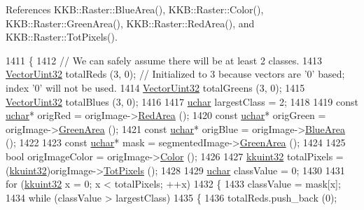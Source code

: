 References K\+K\+B\+::\+Raster\+::\+Blue\+Area(), K\+K\+B\+::\+Raster\+::\+Color(), K\+K\+B\+::\+Raster\+::\+Green\+Area(), K\+K\+B\+::\+Raster\+::\+Red\+Area(), and K\+K\+B\+::\+Raster\+::\+Tot\+Pixels().


\begin{DoxyCode}
1411 \{
1412   \textcolor{comment}{// We can safely assume there will be at least 2 classes.}
1413   \hyperlink{namespace_k_k_b_ab5f0d7bc82b746e1e75e48a6394ccb60}{VectorUint32}  totalReds   (3, 0);  \textcolor{comment}{// Initialized to 3 because vectors are '0' based; index
       '0' will not be used.}
1414   \hyperlink{namespace_k_k_b_ab5f0d7bc82b746e1e75e48a6394ccb60}{VectorUint32}  totalGreens (3, 0);
1415   \hyperlink{namespace_k_k_b_ab5f0d7bc82b746e1e75e48a6394ccb60}{VectorUint32}  totalBlues  (3, 0);
1416 
1417   \hyperlink{namespace_k_k_b_ace9969169bf514f9ee6185186949cdf7}{uchar}  largestClass = 2;
1418 
1419   \textcolor{keyword}{const} \hyperlink{namespace_k_k_b_ace9969169bf514f9ee6185186949cdf7}{uchar}*  origRed   = origImage->\hyperlink{class_k_k_b_1_1_raster_aa3d0f9b4ce0fdd8ac97f996058d09b22}{RedArea}   ();
1420   \textcolor{keyword}{const} \hyperlink{namespace_k_k_b_ace9969169bf514f9ee6185186949cdf7}{uchar}*  origGreen = origImage->\hyperlink{class_k_k_b_1_1_raster_af6ceacfa7835a295d239d141627dbec7}{GreenArea} ();
1421   \textcolor{keyword}{const} \hyperlink{namespace_k_k_b_ace9969169bf514f9ee6185186949cdf7}{uchar}*  origBlue  = origImage->\hyperlink{class_k_k_b_1_1_raster_ade7c77867e6b3833e96f5f86aefcffec}{BlueArea}  ();
1422 
1423   \textcolor{keyword}{const} \hyperlink{namespace_k_k_b_ace9969169bf514f9ee6185186949cdf7}{uchar}*  mask = segmentedImage->\hyperlink{class_k_k_b_1_1_raster_af6ceacfa7835a295d239d141627dbec7}{GreenArea} ();
1424 
1425   \textcolor{keywordtype}{bool}  origImageColor = origImage->\hyperlink{class_k_k_b_1_1_raster_a644248f99009d64ac4b8fef4a22aff25}{Color} ();
1426 
1427   \hyperlink{namespace_k_k_b_af8d832f05c54994a1cce25bd5743e19a}{kkuint32}  totalPixels = (\hyperlink{namespace_k_k_b_af8d832f05c54994a1cce25bd5743e19a}{kkuint32})origImage->\hyperlink{class_k_k_b_1_1_raster_a174a392b71afc2295a0ccbfca3d984e9}{TotPixels} ();
1428 
1429   \hyperlink{namespace_k_k_b_ace9969169bf514f9ee6185186949cdf7}{uchar}  classValue = 0;
1430 
1431   \textcolor{keywordflow}{for}  (\hyperlink{namespace_k_k_b_af8d832f05c54994a1cce25bd5743e19a}{kkuint32} x = 0;  x < totalPixels;  ++x)
1432   \{
1433     classValue = mask[x];
1434     \textcolor{keywordflow}{while} (classValue > largestClass)
1435     \{
1436       totalReds.push\_back   (0);

\end{DoxyCode}
